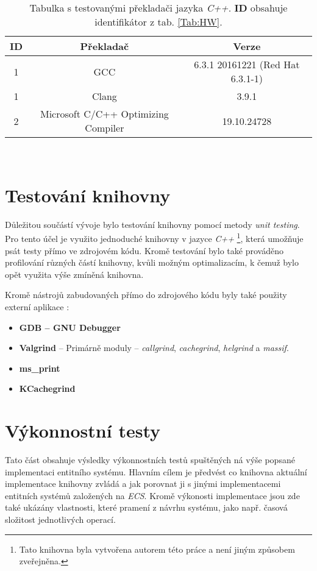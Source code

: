 \begin{table}[H]
	\begin{center}
		\begin{tabular}{| c | c | c |}
			\hline
			\textbf{ID} & \textbf{Překladač} & \textbf{Verze} \\
			\hline
			1 & GCC & 6.3.1 20161221 (Red Hat 6.3.1-1) \\
			\hline
			1 & Clang & 3.9.1 \\
			\hline
			2 & Microsoft C/C++ Optimizing Compiler & 19.10.24728 \\
			\hline
		\end{tabular}\\[1em]
		\caption{Tabulka s testovanými překladači jazyka \emph{C++}. \textbf{ID} obsahuje identifikátor z tab. \ref{Tab:HW}.}
		\label{Tab:Compiler}
	\end{center}
\end{table}

\section{Testování knihovny}

Důležitou součástí vývoje bylo testování knihovny pomocí metody \emph{unit testing}. Pro tento účel je využito jednoduché knihovny v jazyce \emph{C++} \footnote{Tato knihovna byla vytvořena autorem této práce a není jiným způsobem zveřejněna.}, která umožňuje psát testy přímo ve zdrojovém kódu. Kromě testování bylo také prováděno profilování různých částí knihovny, kvůli možným optimalizacím, k čemuž bylo opět využita výše zmíněná knihovna. 

Kromě nástrojů zabudovaných přímo do zdrojového kódu byly také použity externí aplikace : 
\begin{itemize}
	\item \textbf{GDB -- GNU Debugger}
	\item \textbf{Valgrind} -- Primárně moduly -- \emph{callgrind}, \emph{cachegrind}, \emph{helgrind} a \emph{massif}.
	\item \textbf{ms\_print}
	\item \textbf{KCachegrind}
\end{itemize}

\section{Výkonnostní testy}

Tato část obsahuje výsledky výkonnostních testů spuštěných ná výše popsané implementaci entitního systému. Hlavním cílem je předvést co knihovna aktuální implementace knihovny zvládá a jak porovnat ji s jinými implementacemi entitních systémů založených na \emph{ECS}. Kromě výkonosti implementace jsou zde také ukázány vlastnosti, které pramení z návrhu systému, jako např. časová složitost jednotlivých operací.


